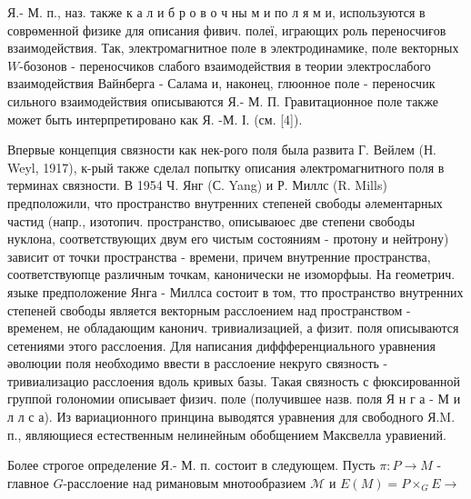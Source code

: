 \documentclass[10pt]{article}
\begin{document}
Я.- М. п., наз. также к а л и б р о в о ч ны м и по л я м и, используются в соврөменной физике для описания фивич. полеї, играющих роль переносчиғов взаимодействия. Так, электромагнитное поле в электродинамике, поле векторных $W$-бозонов - переносчиков слабого взаимодействия в теории электрослабого взаимодействия Вайнберга - Салама и, наконец, глюонное поле - переносчик сильного взаимодействия описываются Я.- М. П. Гравитационное поле также может быть интерпретировано как Я. -М. І. (см. [4]).



Впервые концепция связности как нек-рого поля была развита Г. Вейлем (Н. Weyl, 1917), к-рый также сделал попытку описания әлектромагнитного поля в терминах связности. В 1954 Ч. Янг (С. Yang) и Р. Миллс (R. Mills) предположили, что пространство внутренних степеней свободы әлементарных частид (напр., изотопич. пространство, описываюес две степени свободы нуклона, соответствующих двум его чистым состояниям - протону и нейтрону) зависит от точки пространства - времени, причем внутренние пространства, соответствуюпце различным точкам, канонически не изоморфыы. На геометрич. языке предположение Янга - Миллса состоит в том, тто пространство внутренних степеней свободы является векторным расслоением над пространством - временем, не обладающим канонич. тривиализацией, а физит. поля описываются сетениями этого расслоения. Для написания диффференциального уравнения әволюции поля необходимо ввести в расслоение некруго связность - тривиализацио расслоения вдоль кривых базы. Такая связность с фюксированной группоӥ голономии описывает физич. поле (получившее назв. поля Я н г а - М и л л с а). Из вариационного принцина выводятся уравнения для свободного Я.M. п., являющиеся естественным нелинейным обобщением Максвелла уравиений.



Более строгое определение Я.- М. п. состоит в следующем. Пусть $\pi: P \rightarrow M$ - главное $G$-расслоение над римановым мнотообразием $\mathcal{M}$ и $E(M)=P \times_{G} E \rightarrow$
\end{document}
